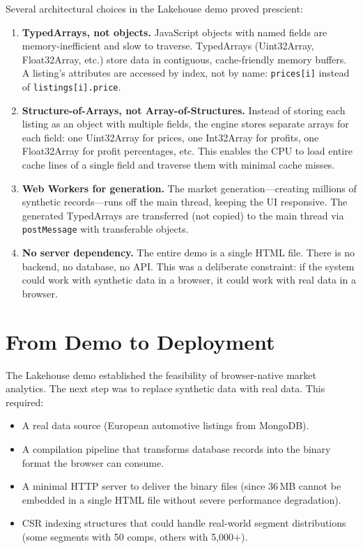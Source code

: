 \documentclass[11pt,a4paper,twoside]{book}
\begin{document}
Several architectural choices in the Lakehouse demo proved prescient:

\begin{enumerate}[leftmargin=*]
    \item \textbf{TypedArrays, not objects.} JavaScript objects with named fields are
          memory-inefficient and slow to traverse. TypedArrays (Uint32Array, Float32Array, etc.)
          store data in contiguous, cache-friendly memory buffers. A listing's attributes are
          accessed by index, not by name: \texttt{prices[i]} instead of
          \texttt{listings[i].price}.
    \item \textbf{Structure-of-Arrays, not Array-of-Structures.} Instead of storing each listing
          as an object with multiple fields, the engine stores separate arrays for each field:
          one Uint32Array for prices, one Int32Array for profits, one Float32Array for profit
          percentages, etc. This enables the CPU to load entire cache lines of a single field
          and traverse them with minimal cache misses.
    \item \textbf{Web Workers for generation.} The market generation---creating millions of
          synthetic records---runs off the main thread, keeping the UI responsive. The generated
          TypedArrays are transferred (not copied) to the main thread via
          \texttt{postMessage} with transferable objects.
    \item \textbf{No server dependency.} The entire demo is a single HTML file. There is no
          backend, no database, no API. This was a deliberate constraint: if the system could
          work with synthetic data in a browser, it could work with real data in a browser.
\end{enumerate}

\section{From Demo to Deployment}

The Lakehouse demo established the feasibility of browser-native market analytics. The next
step was to replace synthetic data with real data. This required:

\begin{itemize}[leftmargin=*]
    \item A real data source (European automotive listings from MongoDB).
    \item A compilation pipeline that transforms database records into the binary format the
          browser can consume.
    \item A minimal HTTP server to deliver the binary files (since 36\,MB cannot be embedded
          in a single HTML file without severe performance degradation).
    \item CSR indexing structures that could handle real-world segment distributions (some
          segments with 50 comps, others with 5,000+).
\end{itemize}
\end{document}
